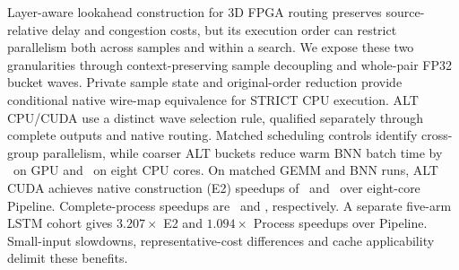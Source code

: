 Layer-aware lookahead construction for 3D FPGA routing preserves source-relative delay and congestion costs, but its execution order can restrict parallelism both across samples and within a search. We expose these two granularities through context-preserving sample decoupling and whole-pair FP32 bucket waves. Private sample state and original-order reduction provide conditional native wire-map equivalence for STRICT CPU execution. ALT CPU/CUDA use a distinct wave selection rule, qualified separately through complete outputs and native routing. Matched scheduling controls identify cross-group parallelism, while coarser ALT buckets reduce warm BNN batch time by \BatchCudaGain\ on GPU and \BatchCpuGain\ on eight CPU cores. On matched GEMM and BNN runs, ALT CUDA achieves native construction (E2) speedups of \GemmNewPipeBuild\ and \BnnNewPipeBuild\ over eight-core Pipeline. Complete-process speedups are \GemmNewPipeProc\ and \BnnNewPipeProc, respectively. A separate five-arm LSTM cohort gives $3.207\times$ E2 and $1.094\times$ Process speedups over Pipeline. Small-input slowdowns, representative-cost differences and cache applicability delimit these benefits.
